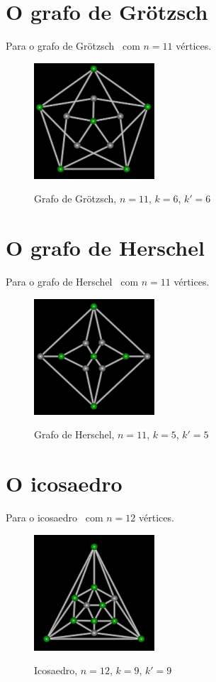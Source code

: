\section{O grafo de Grötzsch}
Para o grafo de Grötzsch~\cite{cite:example-grotzsch} com $n=11$
vértices.

\begin{figure}[htb]
\centering
\includegraphics[width=0.4\textwidth]{img/grotzsch.png}
\label{fig:example-grotzsch}
\caption{Grafo de Grötzsch, $n=11$, $k=6$, $k'=6$}
\end{figure}


\section{O grafo de Herschel}
Para o grafo de Herschel~\cite{cite:example-herschel} com $n=11$
vértices.

\begin{figure}[htb]
\centering
\includegraphics[width=0.4\textwidth]{img/herschel.png}
\label{fig:example-herschel}
\caption{Grafo de Herschel, $n=11$, $k=5$, $k'=5$}
\end{figure}


\section{O icosaedro}
Para o icosaedro~\cite{cite:example-plato} com $n=12$ vértices.

\begin{figure}[htb]
\centering
\includegraphics[width=0.4\textwidth]{img/icosaedro.png}
\label{fig:example-icosaedro}
\caption{Icosaedro, $n=12$, $k=9$, $k'=9$}
\end{figure}


